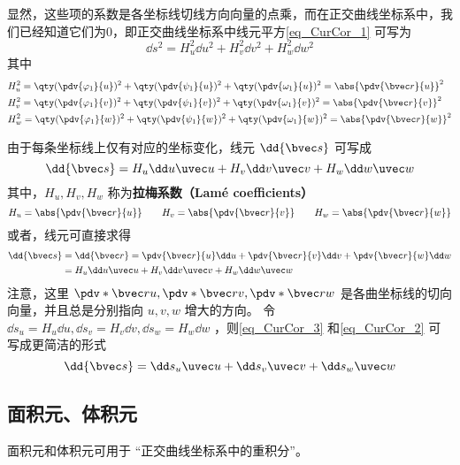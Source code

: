 显然，这些项的系数是各坐标线切线方向向量的点乘，而在正交曲线坐标系中，我们已经知道它们为0，即正交曲线坐标系中线元平方\autoref{eq_CurCor_1} 可写为
\begin{equation}
\dd s^2=H_u^2\dd u^2+H_v^2\dd v^2+H_w^2\dd w^2
\end{equation}
其中
\begin{equation}
\begin{aligned}
&H_u^2=\qty(\pdv{\varphi_1}{u})^2+\qty(\pdv{\psi_1}{u})^2+\qty(\pdv{\omega_1}{u})^2=\abs{\pdv{\bvec r}{u}}^2\\
&H_v^2=\qty(\pdv{\varphi_1}{v})^2+\qty(\pdv{\psi_1}{v})^2+\qty(\pdv{\omega_1}{v})^2=\abs{\pdv{\bvec r}{v}}^2\\
&H_w^2=\qty(\pdv{\varphi_1}{w})^2+\qty(\pdv{\psi_1}{w})^2+\qty(\pdv{\omega_1}{w})^2=\abs{\pdv{\bvec r}{w}}^2
\end{aligned}
\end{equation}

由于每条坐标线上仅有对应的坐标变化，线元 $\dd {\bvec s}$ 可写成
\begin{equation}\label{eq_CurCor_3}
\dd {\bvec s}=H_u\dd u\uvec u+H_v\dd v\uvec v+H_w\dd w\uvec w
\end{equation}
其中，$H_u,H_v,H_w$ 称为\textbf{拉梅系数（Lamé coefficients）}
\begin{equation}
H_u=\abs{\pdv{\bvec r}{u}}\qquad
H_v=\abs{\pdv{\bvec r}{v}}\qquad
H_w=\abs{\pdv{\bvec r}{w}}
\end{equation}
或者，线元可直接求得
\begin{equation}\label{eq_CurCor_2}
\begin{aligned}
\dd {\bvec s}&=\dd {\bvec r}=\pdv{\bvec r}{u}\dd u+\pdv{\bvec r}{v}\dd v+\pdv{\bvec r}{w}\dd w\\
&=H_u\dd u\uvec u+H_v\dd v\uvec v+H_w\dd w\uvec w
\end{aligned}
\end{equation}
注意，这里 $\pdv*{\bvec r}{u},\pdv*{\bvec r}{v},\pdv*{\bvec r}{w}$ 是各曲坐标线的切向向量，并且总是分别指向 $u,v,w$ 增大的方向。
令 $\dd s_u=H_u\dd u,\dd s_v=H_v\dd v,\dd s_w=H_w\dd w$ ，则\autoref{eq_CurCor_3} 和\autoref{eq_CurCor_2} 可写成更简洁的形式
\begin{equation}
\dd {\bvec s}=\dd s_u\uvec u+\dd s_v\uvec v+\dd s_w\uvec w
\end{equation}

\subsection{面积元、体积元}
面积元和体积元可用于 “正交曲线坐标系中的重积分”。

